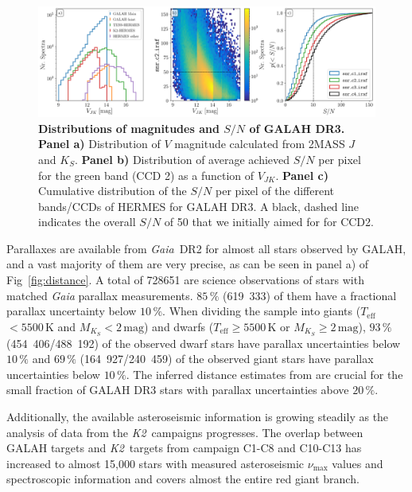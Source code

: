 \documentclass[fleqn,usenatbib,useAMS]{mnras}
\newcommand{\Teff}{$T_\mathrm{eff}$\xspace}
\newcommand{\Gaia}{\textit{Gaia}\xspace}
\newcommand{\Ktwo}{\textit{K2}\xspace}
\begin{document}
\begin{figure}
\centering
\includegraphics[width=\textwidth]{figures/hist_vjk_snr.png}
\caption{
\textbf{Distributions of magnitudes and $S/N$ of GALAH DR3.}
\textbf{Panel a)} Distribution of $V$ magnitude calculated from 2MASS $J$ and $K_S$.
\textbf{Panel b)} Distribution of average achieved $S/N$ per pixel for the green band (CCD 2) as a function of $V_{JK}$.
\textbf{Panel c)} Cumulative distribution of the $S/N$ per pixel of the different bands/CCDs of HERMES for GALAH DR3. A black, dashed line indicates the overall $S/N$ of 50 that we initially aimed for for CCD2.}
\label{fig:hist_vjk_snr}
\end{figure}

Parallaxes are available from \Gaia\ DR2 for almost all stars observed by GALAH, and a vast majority of them are very precise, as can be seen in panel a) of Fig~\ref{fig:distance}. A total of 728651 are science observations of stars with matched \Gaia parallax measurements. $85\,\%$ (619~333) of them have a fractional parallax uncertainty below $10\,\%$. When dividing the sample into giants (\Teff$ < 5500\,\mathrm{K}$ and $M_{K_S} < 2\,\mathrm{mag}$) and dwarfs (\Teff$ \geq 5500\,\mathrm{K}$ or $M_{K_S} \geq 2\,\mathrm{mag}$), $93\,\%$ (454~406/488~192) of the observed dwarf stars have parallax uncertainties below $10\,\%$ and $69\,\%$ (164~927/240~459) of the observed giant stars have parallax uncertainties below $10\,\%$. The inferred distance estimates from \citet{BailerJones2018} are crucial for the small fraction of GALAH DR3 stars with parallax uncertainties above $20\,\%$.

Additionally, the available asteroseismic information is growing steadily as the analysis of data from the \Ktwo\ campaigns progresses. The overlap between GALAH targets and \Ktwo\ targets from campaign C1-C8 and C10-C13 has increased to almost 15,000 stars with measured asteroseismic $\nu_\mathrm{max}$ values and spectroscopic information and covers almost the entire red giant branch.
\end{document}
